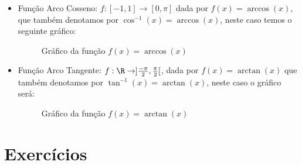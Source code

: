 \begin{itemize}
  \item Função Arco Cosseno: $f: [-1, 1] \rightarrow [0, \pi]$ dada por $f(x)= \arccos(x)$, que também denotamos por $\cos^{-1}(x)= \arccos (x)$, neste caso temos o seguinte gráfico:

  \begin{figure}[H]
  \centering
    \caption{Gráfico da função $f(x)= \arccos(x)$}
  \end{figure}


  \item Função Arco Tangente: $f: \R \rightarrow ]\frac{-\pi}{2}, \frac{\pi}{2}[$, dada por $f(x)= \arctan(x)$ que também denotamos por $\tan^{-1}(x)= \arctan (x)$, neste caso o gráfico será:

  \begin{figure}[H]
  \centering
    \caption{Gráfico da função $f(x)= \arctan(x)$}
  \end{figure}


  \end{itemize}

\section{Exercícios}

\construirExer
